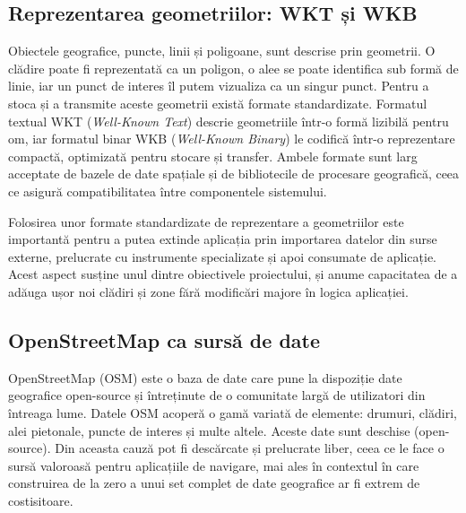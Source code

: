 \subsection{Reprezentarea geometriilor: WKT și WKB}
\label{subsec:wkt-wkb}

Obiectele geografice, puncte, linii și poligoane, sunt descrise prin
geometrii. O clădire poate fi reprezentată ca un poligon, o alee se poate identifica sub formă de linie, iar
un punct de interes îl putem vizualiza ca un singur punct. Pentru a stoca și a transmite aceste
geometrii există formate standardizate. Formatul textual WKT (\textit{Well-Known
Text}) descrie geometriile într-o formă lizibilă pentru om, iar formatul
binar WKB (\textit{Well-Known Binary}) le codifică într-o reprezentare compactă,
optimizată pentru stocare și transfer\cite{OGCSimpleFeatures}. Ambele formate sunt larg acceptate de
bazele de date spațiale și de bibliotecile de procesare geografică, ceea ce
asigură compatibilitatea între componentele sistemului.

Folosirea unor formate standardizate de reprezentare a geometriilor este
importantă pentru a putea extinde aplicația prin importarea datelor din surse
externe, prelucrate cu instrumente specializate și apoi consumate de aplicație. Acest aspect susține unul dintre
obiectivele proiectului, și anume capacitatea de a adăuga ușor noi
clădiri și zone fără modificări majore în logica aplicației.

\subsection{OpenStreetMap ca sursă de date}
\label{subsec:osm}

OpenStreetMap (OSM) este o baza de date care pune la dispoziție date
geografice open-source \cite{OSM} și întreținute de o comunitate largă de
utilizatori din întreaga lume. Datele OSM acoperă o gamă variată de elemente:
drumuri, clădiri, alei pietonale, puncte de interes și multe altele. 
Aceste date sunt deschise (open-source). Din aceasta cauză pot fi descărcate și prelucrate liber, ceea ce le face o
sursă valoroasă pentru aplicațiile de navigare, mai ales în contextul în care
construirea de la zero a unui set complet de date geografice ar fi extrem de
costisitoare.

